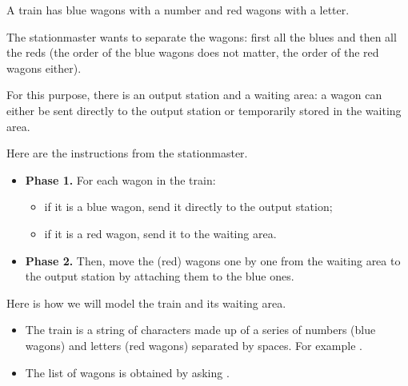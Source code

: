 \documentclass[11pt,class=report,crop=false]{standalone}
\begin{document}
\begin{activite}




A train has blue wagons with a number and red wagons with a letter. 


The stationmaster wants to separate the wagons: first all the blues and then all the reds (the order of the blue wagons does not matter, the order of the red wagons either). 


For this purpose, there is an output station and a waiting area: a wagon can either be sent directly to the output station or temporarily stored in the waiting area.



Here are the instructions from the stationmaster.
\begin{itemize}

  \item \textbf{Phase 1.} For each wagon in the train:
     \begin{itemize} 
       \item if it is a blue wagon, send it directly to the output station;
       \item if it is a red wagon, send it to the waiting area.
     \end{itemize}
   
  \item \textbf{Phase 2.} Then, move the (red) wagons one by one from the waiting area to the output station by attaching them to the blue ones.
\end{itemize}  
 
 
  


Here is how we will model the train and its waiting area.
\begin{itemize}
  \item The train is a string of characters made up of a series of numbers (blue wagons) and letters (red wagons) separated by spaces. For example . 
  
  \item The list of wagons is obtained by asking .
  

\end{itemize}
\end{activite}
\end{document}
